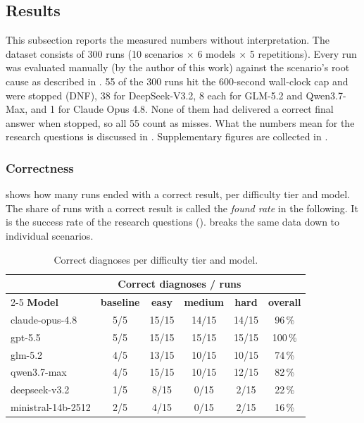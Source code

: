 \subsection{Results}
\label{sec:results}

This subsection reports the measured numbers without interpretation. The dataset
consists of 300 runs (10 scenarios $\times$ 6 models $\times$ 5 repetitions). Every run was evaluated manually (by the author of this work) against the scenario's root cause as
described in . 55 of the 300 runs hit the 600-second wall-clock
cap and were stopped (DNF), 38 for DeepSeek-V3.2, 8 each for GLM-5.2 and Qwen3.7-Max, and 1 for
Claude Opus 4.8. None of them had delivered a correct final answer when stopped, so
all 55 count as misses. What the numbers mean for the research questions is discussed in
. Supplementary figures are collected in .

\subsubsection{Correctness}
\label{sec:results-correctness}

 shows how many runs ended with a correct result, per difficulty
tier and model. The share of runs with a correct result is called the \emph{found rate} in
the following. It is the success rate of the research questions
().  breaks the same data down to individual scenarios.

\begin{table}[H]
\centering
\small
\begin{tabular}{@{}lcccc c@{}}
\toprule
 & \multicolumn{4}{c}{\textbf{Correct diagnoses / runs}} & \\
\cmidrule(lr){2-5}
\textbf{Model} & \textbf{baseline} & \textbf{easy} & \textbf{medium} & \textbf{hard} & \textbf{overall} \\
\midrule
claude-opus-4.8      & 5/5 & 15/15 & 14/15 & 14/15 & 96\,\% \\
gpt-5.5              & 5/5 & 15/15 & 15/15 & 15/15 & 100\,\% \\
glm-5.2              & 4/5 & 13/15 & 10/15 & 10/15 & 74\,\% \\
qwen3.7-max          & 4/5 & 15/15 & 10/15 & 12/15 & 82\,\% \\
deepseek-v3.2        & 1/5 &  8/15 &  0/15 &  2/15 & 22\,\% \\
ministral-14b-2512   & 2/5 &  4/15 &  0/15 &  2/15 & 16\,\% \\
\bottomrule
\end{tabular}
\caption{Correct diagnoses per difficulty tier and model.}
\label{tab:found-rate-tier}
\end{table}

